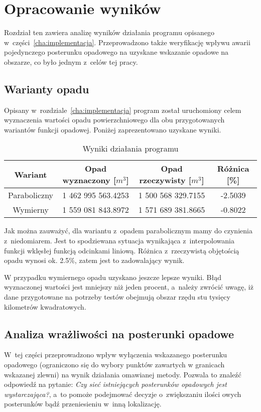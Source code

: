 \chapter{Opracowanie wyników}

Rozdział ten zawiera analizę wyników działania programu opisanego w~części~\ref{cha:implementacja}. Przeprowadzono także weryfikację wpływu awarii pojedynczego posterunku opadowego na uzyskane wskazanie opadowe na obszarze, co było jednym z~celów tej pracy.

\section{Warianty opadu}
Opisany w~rozdziale~\ref{cha:implementacja} program został uruchomiony celem wyznaczenia wartości opadu powierzchniowego dla obu przygotowanych wariantów funkcji opadowej. Poniżej zaprezentowano uzyskane wyniki.

\begin{table}[!ht]
\caption{Wyniki działania programu}
\begin{center}
\begin{tabular}{|c|c|c|c|}
\hline
 Wariant      & Opad wyznaczony [$m^3$] & Opad rzeczywisty [$m^3$] & Różnica [\%] \\ \hline \hline

 Paraboliczny & 1 462 995 563.4253  &   1 500 568 329.7155  &  -2.5039 \\ \hline
 Wymierny     & 1 559 081 843.8972  &   1 571 689 381.8665  &  -0.8022 \\ \hline

\end{tabular}
\end{center}
\end{table}

Jak można zauważyć, dla wariantu z~opadem parabolicznym mamy do czynienia z~niedomiarem. Jest to spodziewana sytuacja wynikająca z~interpolowania funkcji wklęsłej funkcją odcinkami liniową. Różnica z~rzeczywistą objętością opadu wynosi ok. 2.5\%, zatem jest to zadowalający wynik.

W przypadku wymiernego opadu uzyskano jeszcze lepsze wyniki. Błąd wyznaczonej wartości jest mniejszy niż jeden procent, a~należy zwrócić uwagę, iż dane przygotowane na potrzeby testów obejmują obszar rzędu stu tysięcy kilometrów kwadratowych.



\section{Analiza wrażliwości na posterunki opadowe}
W~tej części przeprowadzono wpływ wyłączenia wskazanego posterunku opadowego (ograniczono się do wybory punktów zawartych w granicach wskazanej zlewni) na wynik działania omawianej metody. Pozwala to znaleźć odpowiedź na pytanie: \textit{Czy sieć istniejących posterunków opadowych jest wystarczająca?}, a~to pomoże podejmować decyzje o~zwiększaniu ilości owych posterunków bądź przeniesieniu w~inną lokalizację.


